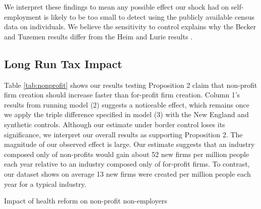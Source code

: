 \documentclass[12pt]{article}
\begin{document}
We interpret these findings to mean any possible effect our shock had on self-employment is likely to be too small to detect using the publicly available census data on individuals. We believe the sensitivity to control explains why the Becker and Tuzemen \cite{tuzemen} results differ from the Heim and Lurie results \cite{heimLurie}. 

\subsection{Long Run Tax Impact}

Table \ref{tab:nonprofit} shows our results testing Proposition 2 claim that non-profit firm creation should increase faster than for-profit firm creation. Column 1's results from running model (2) suggests a noticeable effect, which remains once we apply the triple difference specified in model (3) with the New England and synthetic controls. Although our estimate under border control loses its significance, we interpret our overall results as supporting Proposition 2. The magnitude of our observed effect is large. Our estimate suggests that an industry composed only of non-profits would gain about 52 new firms per million people each year relative to an industry composed only of for-profit firms. To contrast, our dataset shows on average 13 new firms were created per million people each year for a typical industry. 

\begin{table}[H]
	\centering
	\caption{Impact of health reform on non-profit non-employers}
	
	\label{tab:nonprofit}
\end{table}
\end{document}
